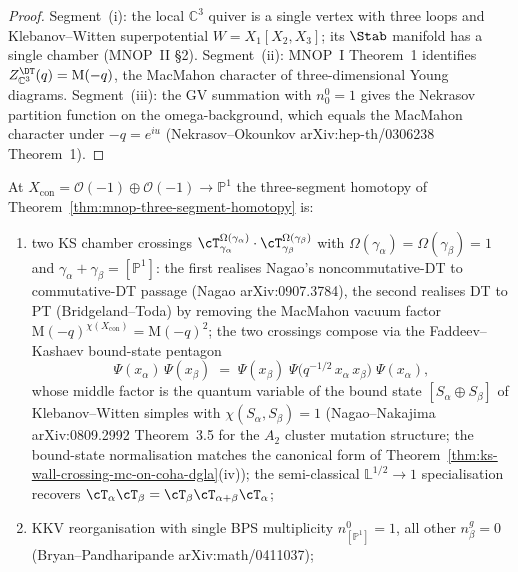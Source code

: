 \begin{proof}
Segment~(i): the local $\mathbb{C}^{3}$ quiver is a single vertex
with three loops and Klebanov--Witten superpotential
$W = X_{1}[X_{2}, X_{3}]$; its $\Stab$ manifold has a single chamber
(MNOP~II \S2). Segment~(ii): MNOP~I Theorem~1 identifies
$Z^{\DT}_{\mathbb{C}^{3}}(q) = \mathrm{M}(-q)$, the MacMahon
character of three-dimensional Young diagrams. Segment~(iii): the
GV summation with $n^{0}_{0} = 1$ gives the Nekrasov partition
function on the omega-background, which equals the MacMahon
character under $-q = e^{iu}$
(Nekrasov--Okounkov \textup{arXiv:hep-th/0306238} Theorem~1).
\end{proof}

\begin{proposition}
\label{prop:mnop-conifold-nagao-pentagon}
At $X_{\mathrm{con}} = \mathcal{O}(-1) \oplus \mathcal{O}(-1) \to \mathbb{P}^{1}$
the three-segment homotopy of Theorem~\ref{thm:mnop-three-segment-homotopy}
is:
\begin{enumerate}[label=\textup{(\roman*)}]
\item two KS chamber crossings
 $\cT_{\gamma_{\alpha}}^{\Omega(\gamma_{\alpha})} \cdot
 \cT_{\gamma_{\beta}}^{\Omega(\gamma_{\beta})}$
 with $\Omega(\gamma_{\alpha}) = \Omega(\gamma_{\beta}) = 1$ and
 $\gamma_{\alpha} + \gamma_{\beta} = [\mathbb{P}^{1}]$: the first
 realises Nagao's noncommutative-DT to commutative-DT passage
 (Nagao \textup{arXiv:0907.3784}), the second realises DT to PT
 (Bridgeland--Toda) by removing the MacMahon vacuum factor
 $\mathrm{M}(-q)^{\chi(X_{\mathrm{con}})} = \mathrm{M}(-q)^{2}$;
 the two crossings compose via the Faddeev--Kashaev bound-state
 pentagon
 \[
 \Psi(x_\alpha)\,\Psi(x_\beta)
 \;=\;
 \Psi(x_\beta)\;
 \Psi\!\bigl(q^{-1/2}\, x_\alpha\, x_\beta\bigr)\;
 \Psi(x_\alpha),
 \]
 whose middle factor is the quantum variable of the bound state
 $[S_\alpha \oplus S_\beta]$ of Klebanov--Witten simples with
 $\chi(S_\alpha, S_\beta) = 1$ (Nagao--Nakajima
 \textup{arXiv:0809.2992} Theorem~3.5 for the $A_2$ cluster mutation
 structure; the bound-state normalisation matches the canonical form
 of Theorem~\ref{thm:ks-wall-crossing-mc-on-coha-dgla}(iv)); the
 semi-classical $\mathbb{L}^{1/2} \to 1$ specialisation recovers
 $\cT_\alpha \cT_\beta = \cT_\beta \cT_{\alpha+\beta} \cT_\alpha$;
\item KKV reorganisation with single BPS multiplicity
 $n^{0}_{[\mathbb{P}^{1}]} = 1$, all other $n^{g}_\beta = 0$
 (Bryan--Pandharipande \textup{arXiv:math/0411037});

\end{enumerate}
\end{proposition}
